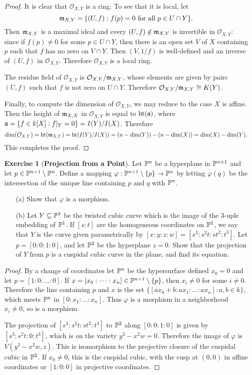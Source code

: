 \documentclass[11pt]{book}
\theoremstyle{definition}
\newtheorem{exercise}{Exercise}[section]
\begin{document}
\begin{proof}
It is clear that $\mathcal{O}_{X,Y}$ is a ring. To see that it is local, let
\[\m_{X,Y}=\{(U,f):\text{$f(p)=0$ for all $p\in U\cap Y$}\}.\]
Then $\m_{X,Y}$ is a maximal ideal and every $(U,f)\notin\m_{X,Y}$ is invertible in $\mathcal{O}_{X,Y}$: since if $f(p)\neq 0$ for some $p\in U\cap Y$, then there is an open set $V$ of $X$ containing $p$ such that $f$ has no zero on $V\cap Y$. Then $(V,1/f)$ is well-defined and an inverse of $(U,f)$ in $\mathcal{O}_{X,Y}$. Therefore $\mathcal{O}_{X,Y}$ is a local ring.\par
The residue field of $\mathcal{O}_{X,Y}$ is $\mathcal{O}_{X,Y}/\m_{X,Y}$, whose elements are given by pairs $(U,f)$ such that $f$ is not zero on $U\cap Y$. Therefore $\mathcal{O}_{X,Y}/\m_{X,Y}\cong K(Y)$.\par
Finally, to compute the dimension of $\mathcal{O}_{X,Y}$, we may reduce to the case $X$ is affine. Then the height of $\m_{X,X}$ in $\mathcal{O}_{X,Y}$ is equal to $\height(\a)$, where $\a=\{f\in k[X]:f|_Y=0\}=I(Y)/I(X)$. Therefore
\[\dim(\mathcal{O}_{X,Y})=\height(\m_{X,Y})=\height(I(Y)/I(X))=(n-\dim(Y))-(n-\dim(X))=\dim(X)-\dim(Y).\]
This completes the proof.
\end{proof}
\begin{exercise}[\textbf{Projection from a Point}]
Let $\P^n$ be a hyperplane in $\P^{n+1}$ and let $p\in\P^{n+1}\setminus\P^n$. Define a mapping $\varphi:\P^{n+1}\setminus\{p\}\to\P^n$ by letting $\varphi(q)$ be the intersection of the unique line containing $p$ and $q$ with $\P^n$.
\begin{itemize}
\item[(a)] Show that $\varphi$ is a morphism.
\item[(b)] Let $Y\sub\P^3$ be the twisted cubic curve which is the image of the $3$-uple embedding of $\P^1$. If $[s:t]$ are the homogeneous coordinates on $\P^1$, we say that $Y$ is the curve given parametrically by $[x:y:z:w]=[s^3:s^2t:st^2:t^3]$. Let $p=[0:0:1:0]$, and let $\P^2$ be the hyperplane $z=0$. Show that the projection of $Y$ from $p$ is a cuspidal cubic curve in the plane, and find its equation. 
\end{itemize}
\end{exercise}
\begin{proof}
By a change of coordinates let $\P^n$ be the hypersurface defined $x_0=0$ and let $p=[1:0:\dots:0]$. If $x=[x_0:\dots:x_n]\in\P^{n+1}\setminus\{p\}$, then $x_i\neq 0$ for some $i\neq 0$. Therefore the line containing $p$ and $x$ is the set $\{[ax_0+b:ax_1:\dots:ax_n]:a,b\in k\}$, which meets $\P^n$ in $[0:x_1:\dots:x_n]$. Thus $\varphi$ is a morphism in a neighborhood $x_i\neq 0$, so is a morphism.\par
The projection of $[s^3:s^2t:st^2:t^3]$ to $\P^2$ along $[0:0:1:0]$ is given by $[s^3:s^2t:0:t^3]$, which is on the variety $y^3-x^2w=0$. Therefore the image of $\varphi$ is $V(y^3-x^2w,z)$. This is isomorphism to the projective closure of the cuspidal cubic in $\P^2$. If $x_0\neq 0$, this is the cuspidal cubic, with the cusp at $(0,0)$ in affine coordinates or $[1:0:0]$ in projective coordinates.
\end{proof}
\end{document}
